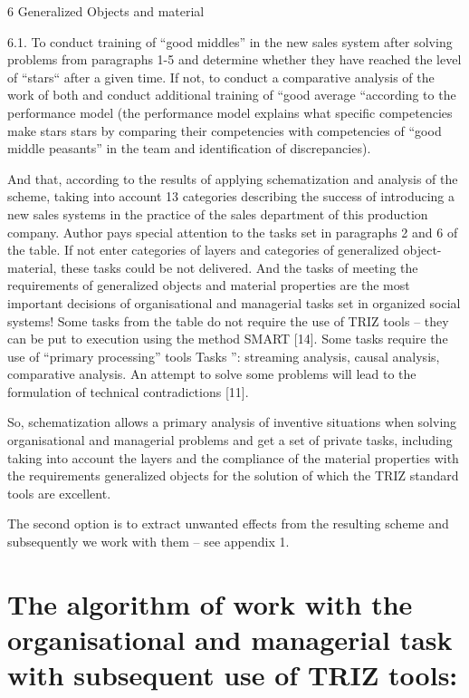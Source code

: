 \documentclass[11pt,a4paper]{book}
\begin{document}
6 Generalized Objects and material

6.1.  To conduct training of “good middles” in the new sales system after
solving problems from paragraphs 1-5 and determine whether they have reached
the level of “stars“ after a given time. If not, to conduct a comparative
analysis of the work of both and conduct additional training of “good average
“according to the performance model (the performance model explains what
specific competencies make stars stars by comparing their competencies with
competencies of “good middle peasants” in the team and identification of
discrepancies).


And that, according to the results of applying schematization and analysis of
the scheme, taking into account 13 categories describing the success of
introducing a new sales systems in the practice of the sales department of
this production company. Author pays special attention to the tasks set in
paragraphs 2 and 6 of the table. If not enter categories of layers and
categories of generalized object-material, these tasks could be not delivered. And the
tasks of meeting the requirements of generalized objects and material properties are the
most important decisions of organisational and managerial tasks set in
organized social systems! Some tasks from the table do not require the use of
TRIZ tools -- they can be put to execution using the method SMART [14]. Some
tasks require the use of “primary processing” tools Tasks ”: streaming
analysis, causal analysis, comparative analysis.  An attempt to solve some
problems will lead to the formulation of technical contradictions [11].

So, schematization allows a primary analysis of inventive situations when
solving organisational and managerial problems and get a set of private tasks,
including taking into account the layers and the compliance of the material
properties with the requirements generalized objects for the solution of which the TRIZ
standard tools are excellent.

The second option is to extract unwanted effects from the resulting scheme and
subsequently we work with them -- see appendix 1.

\section[The algorithm]{The algorithm of work with the organisational and
  managerial task with subsequent use of TRIZ tools:}
\end{document}

